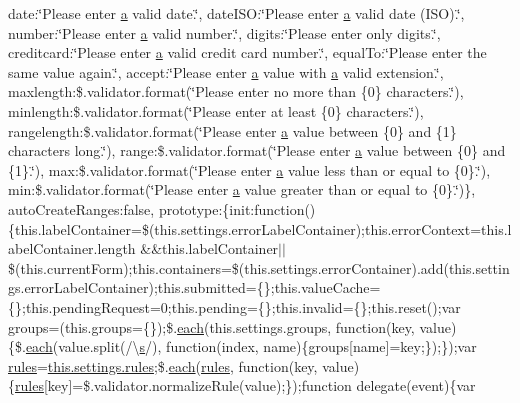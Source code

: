 \begin{DoxyCompactItemize}
date\+:\char`\"{}Please enter \hyperlink{_scripts_2bootstrap_8min_8js_a7318f59fb86a4437995ee89c780c51ac}{a} valid date.\char`\"{}, date\+I\+S\+O\+:\char`\"{}Please enter \hyperlink{_scripts_2bootstrap_8min_8js_a7318f59fb86a4437995ee89c780c51ac}{a} valid date (I\+SO).\char`\"{}, number\+:\char`\"{}Please enter \hyperlink{_scripts_2bootstrap_8min_8js_a7318f59fb86a4437995ee89c780c51ac}{a} valid number.\char`\"{}, digits\+:\char`\"{}Please enter only digits.\char`\"{}, creditcard\+:\char`\"{}Please enter \hyperlink{_scripts_2bootstrap_8min_8js_a7318f59fb86a4437995ee89c780c51ac}{a} valid credit card number.\char`\"{}, equal\+To\+:\char`\"{}Please enter the same value again.\char`\"{}, accept\+:\char`\"{}Please enter \hyperlink{_scripts_2bootstrap_8min_8js_a7318f59fb86a4437995ee89c780c51ac}{a} value with \hyperlink{_scripts_2bootstrap_8min_8js_a7318f59fb86a4437995ee89c780c51ac}{a} valid extension.\char`\"{}, maxlength\+:\$.\+validator.\+format(\char`\"{}Please enter no more than \{0\} characters.\char`\"{}), minlength\+:\$.\+validator.\+format(\char`\"{}Please enter at least \{0\} characters.\char`\"{}), rangelength\+:\$.\+validator.\+format(\char`\"{}Please enter \hyperlink{_scripts_2bootstrap_8min_8js_a7318f59fb86a4437995ee89c780c51ac}{a} value between \{0\} and \{1\} characters long.\char`\"{}), range\+:\$.\+validator.\+format(\char`\"{}Please enter \hyperlink{_scripts_2bootstrap_8min_8js_a7318f59fb86a4437995ee89c780c51ac}{a} value between \{0\} and \{1\}.\char`\"{}), max\+:\$.\+validator.\+format(\char`\"{}Please enter \hyperlink{_scripts_2bootstrap_8min_8js_a7318f59fb86a4437995ee89c780c51ac}{a} value less than or equal to \{0\}.\char`\"{}), min\+:\$.\+validator.\+format(\char`\"{}Please enter \hyperlink{_scripts_2bootstrap_8min_8js_a7318f59fb86a4437995ee89c780c51ac}{a} value greater than or equal to \{0\}.\char`\"{})\}, auto\+Create\+Ranges\+:false, prototype\+:\{init\+:function()\{this.\+label\+Container=\$(this.\+settings.\+error\+Label\+Container);this.\+error\+Context=this.\+label\+Container.\+length \&\&this.\+label\+Container$\vert$$\vert$\$(this.\+current\+Form);this.\+containers=\$(this.\+settings.\+error\+Container).add(this.\+settings.\+error\+Label\+Container);this.\+submitted=\{\};this.\+value\+Cache=\{\};this.\+pending\+Request=0;this.\+pending=\{\};this.\+invalid=\{\};this.\+reset();var groups=(this.\+groups=\{\});\$.\hyperlink{_scripts_2jquery-1_810_82_8min_8js_af24c9ea1e34372f8c8b312b35586008d}{each}(this.\+settings.\+groups, function(key, value)\{\$.\hyperlink{_scripts_2jquery-1_810_82_8min_8js_af24c9ea1e34372f8c8b312b35586008d}{each}(value.\+split(/\textbackslash{}\hyperlink{_scripts_2respond_8min_8js_ad9a7d92cb87932d25187fdec3ba1b621}{s}/), function(index, name)\{groups\mbox{[}name\mbox{]}=key;\});\});var \hyperlink{_scripts_2respond_8js_ada87c2e257bc5ff6e77cdbc23ed986a3}{rules}=\hyperlink{_scripts_2respond_8js_ada87c2e257bc5ff6e77cdbc23ed986a3}{this.\+settings.\+rules};\$.\hyperlink{_scripts_2jquery-1_810_82_8min_8js_af24c9ea1e34372f8c8b312b35586008d}{each}(\hyperlink{_scripts_2respond_8js_ada87c2e257bc5ff6e77cdbc23ed986a3}{rules}, function(key, value)\{\hyperlink{_scripts_2respond_8js_ada87c2e257bc5ff6e77cdbc23ed986a3}{rules}\mbox{[}key\mbox{]}=\$.validator.\+normalize\+Rule(value);\});function delegate(event)\{var 
\end{DoxyCompactItemize}
